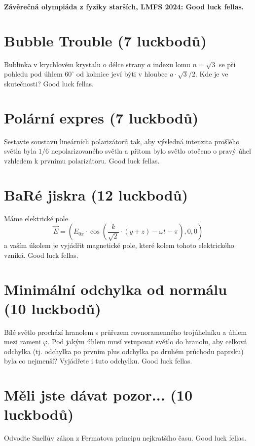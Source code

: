 \documentclass[11pt,a4paper,landscape]{article}
\author{Tomáš Dolák}
\begin{document}
\pagestyle{empty}
\textbf{\center\LARGE Závěrečná olympiáda z fyziky starších, LMFS 2024: Good luck fellas.}
\vfill

\begin{multicols}{2}[]

\section{Bubble Trouble (7 luckbodů)}
Bublinka v krychlovém krystalu o délce strany $a$ indexu lomu $n=\sqrt{3}$ se při pohledu pod úhlem $60^\circ$ od kolmice jeví býti v hloubce $a\cdot\sqrt{3}/2$. Kde je ve skutečnosti? Good luck fellas.

\section{Polární expres (7 luckbodů)}
Sestavte soustavu lineárních polarizátorů tak, aby výsledná intenzita prošlého světla byla $1/6$ nepolarizovaného světla a přitom bylo světlo otočeno o pravý úhel vzhledem k prvnímu polarizátoru. Good luck fellas.

\section{BaRé jiskra (12 luckbodů)}
Máme elektrické pole 
\begin{equation}
\vec{E} = \left(E_{0x}\cdot\cos\left(\frac{k}{\sqrt{2}}\cdot\left(y+z\right) - \omega t - \pi\right),0,0\right)
\end{equation}
a vaším úkolem je vyjádřit magnetické pole, které kolem tohoto elektrického vzniká. Good luck fellas.

\section{Minimální odchylka od normálu (10 luckbodů)}
Bílé světlo prochází hranolem s průřezem rovnoramenného trojúhelníku a úhlem mezi rameni $\varphi$. Pod jakým úhlem musí vstupovat světlo do hranolu, aby celková odchylka (tj. odchylka po prvním plus odchylka po druhém průchodu paprsku) byla co nejmenší? Vyjádřete i tuto odchylku. Good luck fellas.

\section{Měli jste dávat pozor... (10 luckbodů)}
Odvodťe Snellův zákon z Fermatova principu nejkratšího času. Good luck fellas.


\end{multicols}
\end{document}

